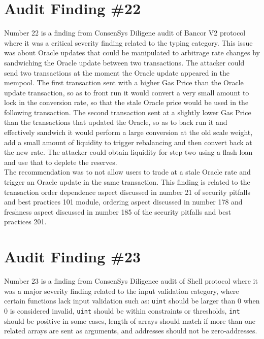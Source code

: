 \section{Audit Finding \#22}

Number 22 is a finding from ConsenSys Diligene audit of Bancor V2 protocol where it was a critical severity finding related to the typing category. This issue was about Oracle updates that could be manipulated to arbitrage rate changes by sandwiching the Oracle update between two transactions. The attacker could send two transactions at the moment the Oracle update appeared in the mempool. The first transaction sent with a higher Gas Price than the Oracle update transaction, so as to front run it would convert a very small amount to lock in the conversion rate, so that the stale Oracle price would be used in the following transaction. The second transaction sent at a slightly lower Gas Price than the transactions that updated the Oracle, so as to back run it and effectively sandwich it would perform a large conversion at the old scale weight, add a small amount of liquidity to trigger rebalancing and then convert back at the new rate. The attacker could obtain liquidity for step two using a flash loan and use that to deplete the reserves.\\

The recommendation was to not allow users to trade at a stale Oracle rate and trigger an Oracle update in the same transaction. This finding is related to the transaction order dependence aspect discussed in number 21 of security pitfalls and best practices 101 module, ordering aspect discussed in number 178 and freshness aspect discussed in number 185 of the security pitfalls and best practices 201.

\section{Audit Finding \#23}

Number 23 is a finding from ConsenSys Diligence audit of Shell protocol where it was a major severity finding related to the input validation category, where certain functions lack input validation such as: \verb|uint| should be larger than 0 when 0 is considered invalid, \verb|uint| should be within constraints or thresholds, \verb|int| should be positive in some cases, length of arrays should match if more than one related arrays are sent as arguments, and addresses should not be zero-addresses.\\

